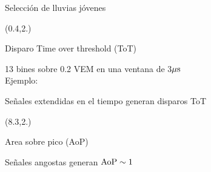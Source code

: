 \begin{frame}{Selecci\'on de lluvias j\'ovenes}
	\begin{center}\footnotesize
		\begin{textblock}{7.3}(0.4,2.)
			\begin{block}{Disparo Time over threshold (ToT)}
			
			{\footnotesize 13 bines sobre 0.2 VEM en una ventana de 3$\mu {\rm s}$}\\
			Ejemplo:
			\begin{center}
			\end{center}
			Se\~nales extendidas en el tiempo generan disparos ToT 
			\end{block}
		\end{textblock}
		
		\begin{textblock}{7.3}(8.3,2.)
			\begin{block}{Area sobre pico (AoP)}
			\begin{center}
			\end{center}
			Se\~nales angostas generan ${\rm AoP}\sim 1$
			\end{block}
		\end{textblock}
		

\end{center}
\end{frame}
